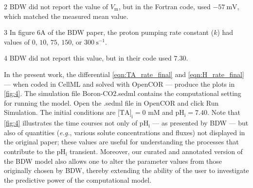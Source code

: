 \documentclass[fleqn,10pt]{physiome}
\begin{document}
\begin{table}[hbt!]
\begin{threeparttable}
\begin{tablenotes}
\item[2] BDW did not report the value of $V_\mathrm{m}$, but in the Fortran code, used $-57~\mathrm{mV}$, which matched the measured mean value.
\item[3] In figure 6A of the BDW paper, the proton pumping rate constant ($k$) had values of $0$, $10$, $75$, $150$, or $300~\mathrm{s}^{-1}$.
\item[4] BDW did not report this value, but in their code used $7.30$.
\end{tablenotes}
\end{threeparttable}
\end{table}

In the present work, the differential \autoref{eqn:TA_rate_final} and \autoref{eqn:H_rate_final} --- when coded in CellML and solved with OpenCOR --- produce the plots in \autoref{fig:4}. The simulation file Boron-CO2.sedml contains the computational setting for running the model. Open the .sedml file in OpenCOR and click Run Simulation. The initial conditions are $[\mathrm{TA]_i}=0$ $\mathrm{mM}$ and $\mathrm{pH_i}=7.40$. Note that \autoref{fig:4} illustrates the time courses not only of $\mathrm{pH_i}$ --- as presented by BDW --- but also of quantities (\emph{e.g.}, various solute concentrations and fluxes) not displayed in the original paper; these values are useful for understanding the processes that contribute to the $\mathrm{pH_i}$ transient. Moreover, our curated and annotated version of the BDW model also allows one to alter the parameter values from those originally chosen by BDW, thereby extending the ability of the user to investigate the predictive power of the computational model.
\end{document}
